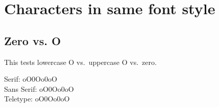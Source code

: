 \section{Characters in same font style}

\subsection{Zero vs. O}

This tests lowercase O vs.\ uppercase O vs.\ zero.\par

\newcommand{\zerotest}[1]{%
  {#1 oO0Oo0oO}
}

Serif: \zerotest{\rmfamily}\\
Sans Serif: \zerotest{\sffamily}\\
Teletype: \zerotest{\ttfamily}\par
